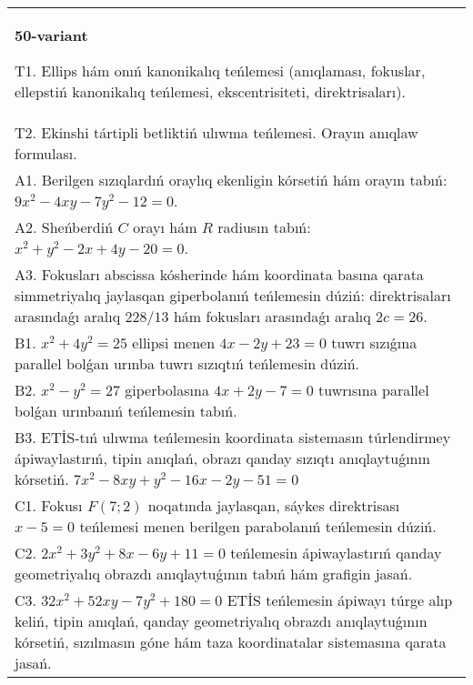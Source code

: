 \documentclass{article}
\begin{document}
\begin{tabular}{m{17cm}}
\textbf{50-variant}
\newline

T1. Ellips hám onıń kanonikalıq teńlemesi (anıqlaması, fokuslar, ellepstiń kanonikalıq teńlemesi, ekscentrisiteti, direktrisaları).\\

T2. Ekinshi tártipli betliktiń ulıwma teńlemesi. Orayın anıqlaw formulası.\\

A1. Berilgen sızıqlardıń oraylıq ekenligin kórsetiń hám orayın tabıń: $9 x^{2}-4 xy-7 y^{2}-12=0$.\\

A2. Sheńberdiń $C$ orayı hám $R$ radiusın tabıń: $x^2+y^2-2 x+4 y-20=0$.\\

A3. Fokusları abscissa kósherinde hám koordinata basına qarata simmetriyalıq jaylasqan giperbolanıń teńlemesin dúziń: direktrisaları arasındaǵı aralıq $228/13$ hám fokusları arasındaǵı aralıq $2 c=26$.\\

B1. $x^{2} + 4y^{2} = 25$ ellipsi menen $4x - 2y + 23 = 0$ tuwrı sızıǵına parallel bolǵan urınba tuwrı sızıqtıń teńlemesin dúziń.  \\

B2. $x^{2} - y^{2} = 27$ giperbolasına $4x + 2y - 7 = 0$ tuwrısına parallel bolǵan urınbanıń teńlemesin tabıń.  \\

B3. ETİS-tıń ulıwma teńlemesin koordinata sistemasın túrlendirmey ápiwaylastırıń, tipin anıqlań, obrazı qanday sızıqtı anıqlaytuǵının kórsetiń. $7x^{2} - 8xy + y^{2} - 16x - 2y - 51 = 0$  \\

C1. Fokusı $F(7;2)$ noqatında jaylasqan, sáykes direktrisası $x - 5 = 0$ teńlemesi menen berilgen parabolanıń teńlemesin dúziń.  \\

C2. $2x^{2} + 3y^{2} + 8x - 6y + 11 = 0$ teńlemesin ápiwaylastırıń qanday geometriyalıq obrazdı anıqlaytuǵının tabıń hám grafigin jasań.\\

C3. $32x^{2} + 52xy - 7y^{2} + 180 = 0$ ETİS teńlemesin ápiwayı túrge alıp keliń, tipin anıqlań, qanday geometriyalıq obrazdı anıqlaytuǵının kórsetiń, sızılmasın góne hám taza koordinatalar sistemasına qarata jasań.  \\

\end{tabular}
\vspace{1cm}
\end{document}
